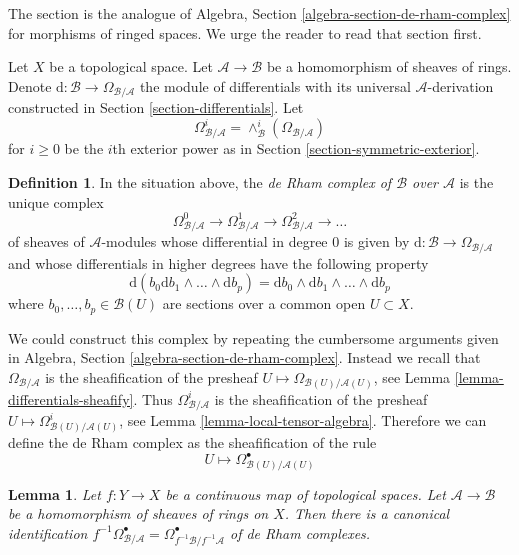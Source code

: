 \documentclass{stacks-project}
\theoremstyle{plain}
\newtheorem{lemma}[subsection]{Lemma}
\theoremstyle{definition}
\newtheorem{definition}[subsection]{Definition}
\theoremstyle{remark}
\numberwithin{equation}{subsection}
\begin{document}
\noindent
The section is the analogue of
Algebra, Section \ref{algebra-section-de-rham-complex} for morphisms of ringed
spaces. We urge the reader to read that section first.

\medskip\noindent
Let $X$ be a topological space. Let $\mathcal{A} \to \mathcal{B}$ be a
homomorphism of sheaves of rings. Denote
$\text{d} : \mathcal{B} \to \Omega_{\mathcal{B}/\mathcal{A}}$
the module of differentials with its universal $\mathcal{A}$-derivation
constructed in Section \ref{section-differentials}.
Let
$$
\Omega_{\mathcal{B}/\mathcal{A}}^i =
\wedge^i_\mathcal{B}(\Omega_{\mathcal{B}/\mathcal{A}})
$$
for $i \geq 0$ be the $i$th exterior power as in
Section \ref{section-symmetric-exterior}.

\begin{definition}
\label{definition-de-rham-complex}
In the situation above, the
{\it de Rham complex of $\mathcal{B}$ over $\mathcal{A}$}
is the unique complex
$$
\Omega_{\mathcal{B}/\mathcal{A}}^0 \to
\Omega_{\mathcal{B}/\mathcal{A}}^1 \to
\Omega_{\mathcal{B}/\mathcal{A}}^2 \to \ldots
$$
of sheaves of $\mathcal{A}$-modules whose differential in degree
$0$ is given by $\text{d} : \mathcal{B} \to \Omega_{\mathcal{B}/\mathcal{A}}$
and whose differentials in higher degrees have the following property
\begin{equation}
\label{equation-rule}
\text{d}\left(b_0\text{d}b_1 \wedge \ldots \wedge \text{d}b_p\right) =
\text{d}b_0 \wedge \text{d}b_1 \wedge \ldots \wedge \text{d}b_p
\end{equation}
where $b_0, \ldots, b_p \in \mathcal{B}(U)$ are sections over a common
open $U \subset X$.
\end{definition}

\noindent
We could construct this complex by repeating the cumbersome arguments
given in Algebra, Section \ref{algebra-section-de-rham-complex}.
Instead we recall that $\Omega_{\mathcal{B}/\mathcal{A}}$ is the
sheafification of the presheaf
$U \mapsto \Omega_{\mathcal{B}(U)/\mathcal{A}(U)}$, see
Lemma \ref{lemma-differentials-sheafify}.
Thus $\Omega_{\mathcal{B}/\mathcal{A}}^i$ is the sheafification of
the presheaf
$U \mapsto \Omega^i_{\mathcal{B}(U)/\mathcal{A}(U)}$, see
Lemma \ref{lemma-local-tensor-algebra}.
Therefore we can define the de Rham complex
as the sheafification of the rule
$$
U \longmapsto
\Omega^\bullet_{\mathcal{B}(U)/\mathcal{A}(U)}
$$

\begin{lemma}
\label{lemma-pullback-de-rham-complex}
Let $f : Y \to X$ be a continuous map of topological spaces.
Let $\mathcal{A} \to \mathcal{B}$
be a homomorphism of sheaves of rings on $X$.
Then there is a canonical identification
$f^{-1}\Omega^\bullet_{\mathcal{B}/\mathcal{A}} =
\Omega^\bullet_{f^{-1}\mathcal{B}/f^{-1}\mathcal{A}}$
of de Rham complexes.
\end{lemma}
\end{document}
